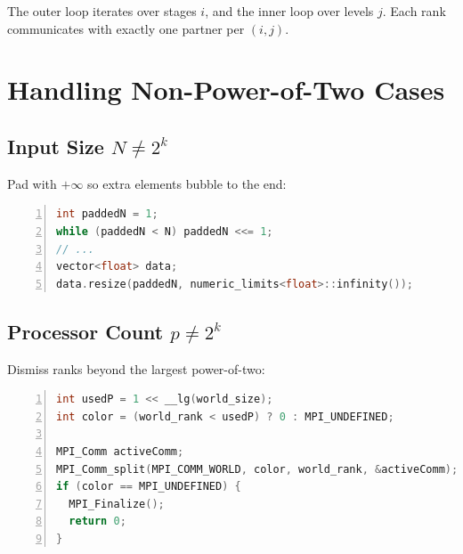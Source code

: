 \documentclass{article}
\begin{document}
The outer loop iterates over stages $i$, and the inner loop over levels $j$. Each rank communicates with exactly one partner per $(i,j)$.

\section*{Handling Non-Power-of-Two Cases}
\subsection*{Input Size $N \neq 2^k$}
Pad with $+\infty$ so extra elements bubble to the end:
\begin{lstlisting}[language=C++, basicstyle=\ttfamily\small, keywordstyle=\color{blue}\bfseries, commentstyle=\color{gray}\itshape, stringstyle=\color{red}, numbers=left, numberstyle=\tiny\color{gray}, stepnumber=1, frame=single, showstringspaces=false, breaklines=true]
int paddedN = 1;
while (paddedN < N) paddedN <<= 1;
// ...
vector<float> data;
data.resize(paddedN, numeric_limits<float>::infinity());
\end{lstlisting}

\subsection*{Processor Count $p \neq 2^k$}
Dismiss ranks beyond the largest power-of-two:
\begin{lstlisting}[language=C++, basicstyle=\ttfamily\small, keywordstyle=\color{blue}\bfseries, commentstyle=\color{gray}\itshape, stringstyle=\color{red}, numbers=left, numberstyle=\tiny\color{gray}, stepnumber=1, frame=single, showstringspaces=false, breaklines=true]
    int usedP = 1 << __lg(world_size);
int color = (world_rank < usedP) ? 0 : MPI_UNDEFINED;

MPI_Comm activeComm;
MPI_Comm_split(MPI_COMM_WORLD, color, world_rank, &activeComm);
if (color == MPI_UNDEFINED) {
  MPI_Finalize();
  return 0;
}
\end{lstlisting}
\end{document}
